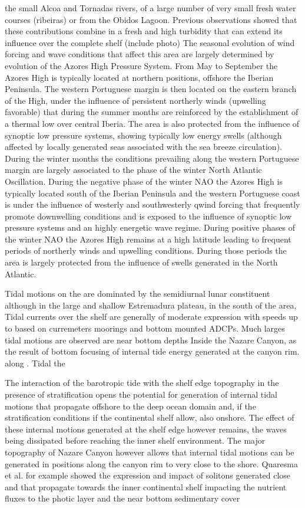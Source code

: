 the small Alcoa and Tornadas rivers, of a large number of very small
fresh water courses (ribeiras) or from the Obidos Lagoon. Previous
observations showed that these contributions combine in a fresh and high
turbidity that can extend its influence over the complete shelf (include
photo) The seasonal evolution of wind forcing and wave conditions that
affect this area are largely determined by evolution of the Azores High
Pressure System. From May to September the Azores High is typically
located at northern positions, offshore the Iberian Peninsula. The
western Portuguese margin is then located on the eastern branch of the
High, under the influence of persistent northerly winds (upwelling
favorable) that during the summer months are reinforced by the
establishment of a thermal low over central Iberia. The area is also
protected from the influence of synoptic low pressure systems, showing
typically low energy swells (although affected by locally generated seas
associated with the sea breeze circulation). During the winter months
the conditions prevailing along the western Portuguese margin are
largely associated to the phase of the winter North Atlantic
Oscillation. During the negative phase of the winter NAO the Azores High
is typically located south of the Iberian Peninsula and the western
Portuguese coast is under the influence of westerly and southwesterly
qwind forcing that frequently promote downwelling conditions and is
exposed to the influence of synoptic low pressure systems and an highly
energetic wave regime. During positive phases of the winter NAO the
Azores High remains at a high latitude leading to frequent periods of
northerly winds and upwelling conditions. During those periods the area
is largely protected from the influence of swells generated in the North
Atlantic.
 
 
Tidal motions on the are dominated by the semidiurnal lunar constituent
although in the large and shallow Estremadura plateau, in the south of
the area, Tidal currents over the shelf are generally of moderate
expression with speeds up to based on curremeters moorings and bottom
mounted ADCPs.  Much larges tidal motions are observed are near bottom
depths Inside the Nazare Canyon, as the result of bottom focusing of
internal tide energy generated at the canyon rim.  along . Tidal the
 
The interaction of the barotropic tide with the shelf edge topography in
the presence of stratification opens the potential for generation of
internal tidal motions that propagate offshore to the deep ocean domain
and, if the stratification conditions if the continental shelf allow,
also onshore. The effect of these internal motions generated at the
shelf edge however remains, the waves being dissipated before reaching
the inner shelf environment. The major topography of Nazare Canyon
however allows that internal tidal motions can be generated in positions
along the canyon rim to very close to the shore. Quaresma et al. for
example showed the expression and impact of solitons generated close and
that propagate towards the inner continental shelf impacting the
nutrient fluxes to the photic layer and the near bottom sedimentary
cover

